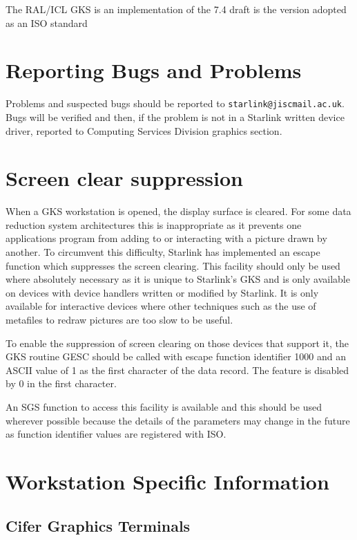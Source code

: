 \documentclass[11pt]{article}
\begin{document}
The RAL/ICL GKS is an implementation of the 7.4 draft
is the version adopted as an ISO standard

\section{Reporting Bugs and Problems}
Problems and suspected bugs should be reported to {\tt starlink@jiscmail.ac.uk}.
Bugs will be verified and then, if the problem is not in a Starlink written
device driver, reported to Computing Services Division graphics section.

\section{Screen clear suppression}
When a GKS workstation is opened, the display surface is cleared.
For some data reduction system architectures this is inappropriate as it
prevents one applications program from adding to or interacting with a picture
drawn by another.
To circumvent this difficulty, Starlink has implemented an escape function which
suppresses the screen clearing.
This facility should only be used where absolutely necessary as it is unique to
Starlink's GKS and is only available on devices with device handlers written
or modified by Starlink.
It is only available for interactive devices where other techniques such as the
use of metafiles to redraw pictures are too slow to be useful.

To enable the suppression of screen clearing on those devices that support it,
the GKS routine GESC should be called with escape function identifier 1000 and
an ASCII value of 1 as the first character of the data record. The feature is
disabled by 0 in the first character.

An SGS function to access this facility is available and this should be used
wherever possible because the details of the parameters may change in the future
as function identifier values are registered with ISO.

\newpage\appendix
\section{Workstation Specific Information}\label{workstations}

\newcommand{\sect}[1]{{\bf #1}}

\subsection{Cifer Graphics Terminals}
\label{cifgt}
\end{document}

